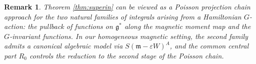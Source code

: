 \documentclass[11pt]{amsart}
\theoremstyle{definition}
\theoremstyle{plain}
\newtheorem{remark}[theorem]{Remark}
\theoremstyle{conclusion}
\begin{document}
\begin{remark} 
Theorem \ref{thm:superin} can be viewed as a Poisson projection chain approach for the two natural families of integrals arising from a Hamiltonian $G$-action: the pullback of functions on $\mathfrak{g}^*$ along the magnetic moment map and the $G$-invariant functions. In our homogeneous magnetic setting, the second family admits a canonical algebraic model via $S(\mathfrak{m}-\varepsilon W)^A$, and the common central part $R_0$ controls the reduction to the second stage of the Poisson chain.
\end{remark}
\end{document}
